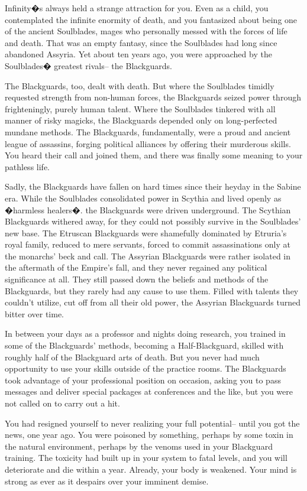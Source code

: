 \documentclass[char]{Kos}
\begin{document}
Infinity�s always held a strange attraction for you. Even as a child, you contemplated the infinite enormity of death, and you fantasized about being one of the ancient Soulblades, mages who personally messed with the forces of life and death. That was an empty fantasy, since the Soulblades had long since abandoned Assyria. Yet about ten years ago, you were approached by the Soulblades� greatest rivals-- the Blackguards.

The Blackguards, too, dealt with death. But where the Soulblades timidly requested strength from non-human forces, the Blackguards seized power through frighteningly, purely human talent.  Where the Soulblades tinkered with all manner of risky magicks, the Blackguards depended only on long-perfected mundane methods. The Blackguards, fundamentally, were a proud and ancient league of assassins, forging political alliances by offering their murderous skills. You heard their call and joined them, and there was finally some meaning to your pathless life.

Sadly, the Blackguards have fallen on hard times since their heyday in the Sabine era. While the Soulblades consolidated power in Scythia and lived openly as �harmless healers�. the Blackguards were driven underground. The Scythian Blackguards withered away, for they could not possibly survive in the Soulblades' new base. The Etruscan Blackguards were shamefully dominated by Etruria's royal family, reduced to mere servants, forced to commit assassinations only at the monarchs' beck and call. The Assyrian Blackguards were rather isolated in the aftermath of the Empire's fall, and they never regained any political significance at all. They still passed down the beliefs and methods of the Blackguards, but they rarely had any cause to use them. Filled with talents they couldn't utilize, cut off from all their old power, the Assyrian Blackguards turned bitter over time.

In between your days as a professor and nights doing research, you trained in some of the Blackguards' methods, becoming a Half-Blackguard, skilled with roughly half of the Blackguard arts of death. But you never had much opportunity to use your skills outside of the practice rooms. The Blackguards took advantage of your professional position on occasion, asking you to pass messages and deliver special packages at conferences and the like, but you were not called on to carry out a hit.

You had resigned yourself to never realizing your full potential-- until you got the news, one year ago. You were poisoned by something, perhaps by some toxin in the natural environment, perhaps by the venoms used in your Blackguard training. The toxicity had built up in your system to fatal levels, and you will deteriorate and die within a year. Already, your body is weakened. Your mind is strong as ever as it despairs over your imminent demise.
\end{document}
